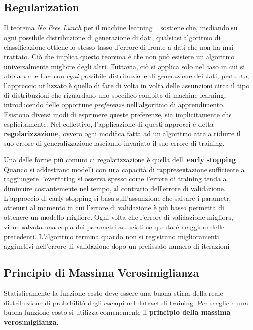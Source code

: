 \documentclass[12pt,a4paper]{report}
\begin{document}
    \subsection{Regularization}  \label{sec:regularization}
    Il teorema \textit{No Free Lunch} per il machine learning 
    ~\cite{Rumelhart1986} sostiene che, mediando su ogni 
    possibile distribuzione di generazione di dati, qualsiasi algoritmo
    di classificazione ottiene lo stesso tasso d'errore di fronte a dati
    che non ha mai trattato. Ci\`o che implica questo teorema \`e che
    non pu\`o esistere un algoritmo universalmente migliore degli altri.
    Tuttavia, ci\`o si applica solo nel caso in cui si abbia a che fare
    con \textit{ogni} possibile distribuzione di generazione dei dati;
    pertanto, l'approccio utilizzato \`e quello di fare di volta in 
    volta delle assunzioni circa il tipo di distribuzioni che riguardano
    uno specifico compito di machine learning, introducendo delle
    opportune \textit{preferenze} nell'algoritmo di apprendimento.
    Esistono diversi modi di esprimere queste preferenze, sia 
    implicitamente che esplicitamente. Nel collettivo, l'applicazione 
    di questi approcci \`e detta \textbf{regolarizzazione}, ovvero ogni
    modifica fatta ad un algoritmo atta a ridurre il suo errore di 
    generalizzazione lasciando invariato il suo errore di training.

    Una delle forme pi\`u comuni di regolarizzazione \`e quella dell'
    \textbf{early stopping}. Quando si addestrano modelli con una
    capacit\`a di rappresentazione sufficiente a raggiungere 
    l'overfitting si osserva spesso come l'errore di training tenda
    a diminuire costantemente nel tempo, al contrario dell'errore di
    validazione. L'approccio di early stopping si basa sull'assunzione
    che salvare i parametri ottenuti al momento in cui l'errore di 
    validazione \`e pi\`u basso permetta di ottenere un modello 
    migliore. Ogni volta che l'errore di validazione migliora, viene
    salvata una copia dei parametri associati se questa \`e maggiore
    delle precedenti. L'algoritmo termina quando non si registrano
    miglioramenti aggiuntivi nell'errore di validazione dopo un 
    prefissato numero di iterazioni.
    
    \newpage
    \subsection{Principio di Massima Verosimiglianza} \label{mllsection}
    Statisticamente la funzione costo deve essere una buona stima della
    reale distribuzione di probabilit\`a degli esempi nel dataset di 
    training. Per scegliere una buona funzione costo si utilizza 
    comunemente il \textbf{principio della massima verosimiglianza}.
    
\end{document}
